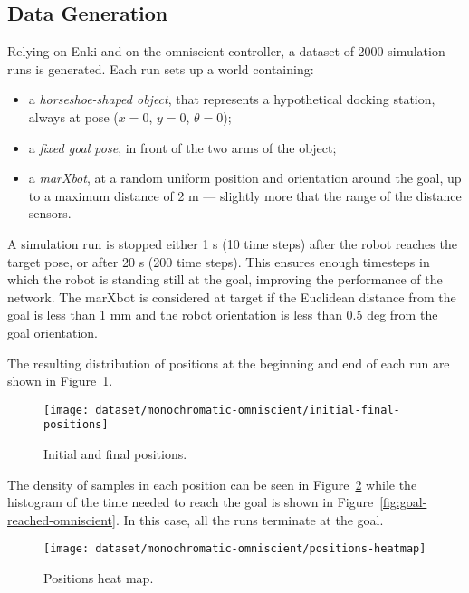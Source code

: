\subsection{Data Generation}
Relying on Enki and on the omniscient controller, a dataset of 2000 simulation 
runs is generated. 
Each run sets up a world containing:
\begin{itemize}
	\item a \emph{horseshoe-shaped object}, that represents a hypothetical 
	docking 
	station, always at pose ($x=0$, $y=0$, $\theta=0$);
	\item a \emph{fixed goal pose}, in front of the two arms of the object;
	\item a \emph{marXbot}, at a random uniform position and orientation 
	around the 
	goal, up to a maximum distance of 2 m --- slightly more that the range 
	of the distance sensors.
\end{itemize}


A simulation run is stopped either 1 s (10 time steps) after the robot 
reaches the target pose, or after 20 s (200 time steps). This ensures
enough timesteps in which the robot is standing still at the goal, improving
the performance of the network. The marXbot is considered at target if the
Euclidean distance from the goal is less than 1 mm and the robot orientation
is less than 0.5 deg from the goal orientation.

The resulting distribution of positions at the beginning and end of each run
are shown in Figure~\ref{fig:initial-final-positions-omniscient}.

\begin{figure}[htbp]
\centerline{\texttt{[image: dataset/monochromatic-omniscient/initial-final-positions]}}
	\caption{Initial and final positions.}
	\label{fig:initial-final-positions-omniscient}
\end{figure}

The density of samples in each position can be seen in Figure~\ref{fig:densisy-omniscient} while the histogram of the time needed to reach 
the goal is shown in Figure~\ref{fig:goal-reached-omniscient}. In this case, 
all the runs terminate at the goal.

\begin{figure}[htbp]
\centerline{\texttt{[image: dataset/monochromatic-omniscient/positions-heatmap]}}
	\caption{Positions heat map.}
	\label{fig:densisy-omniscient}
\end{figure}

